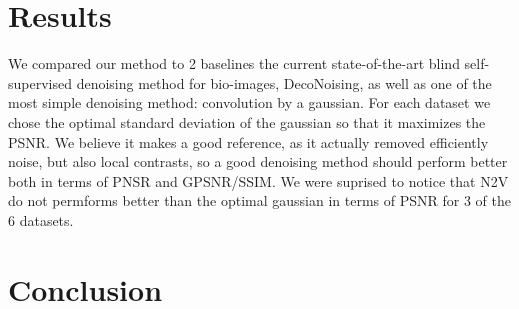 \documentclass{article}
\begin{document}
\section{Results}
We compared our method to 2 baselines the current state-of-the-art blind self-supervised denoising method for bio-images, DecoNoising, as well as one of the most simple denoising method: convolution by a gaussian. For each dataset we chose the optimal standard deviation of the gaussian so that it maximizes the PSNR. We believe it makes a good reference, as it actually removed efficiently noise, but also local contrasts, so a good denoising method should perform better both in terms of PNSR and GPSNR/SSIM. We were suprised to notice that N2V do not permforms better than the optimal gaussian in terms of PSNR for 3 of the 6 datasets.


\section{Conclusion}



{\small


}
\end{document}
